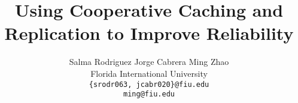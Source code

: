 \documentclass[letterpaper,twocolumn,10pt]{article}
\title{\Large \bf Using Cooperative Caching and Replication to Improve Reliability}
\author{
  {\rm Salma Rodriguez}
  \qquad
  {\rm Jorge Cabrera}
  \qquad
  {\rm Ming Zhao}
  \\
  Florida International University
  \\
  {\rm \texttt{\{srodr063, jcabr020\}@fiu.edu}}
  \\
  {\rm \texttt{ming@fiu.edu}}
}
\date{}
\begin{document}
\maketitle








{
  \footnotesize
  
  
}
\end{document}
